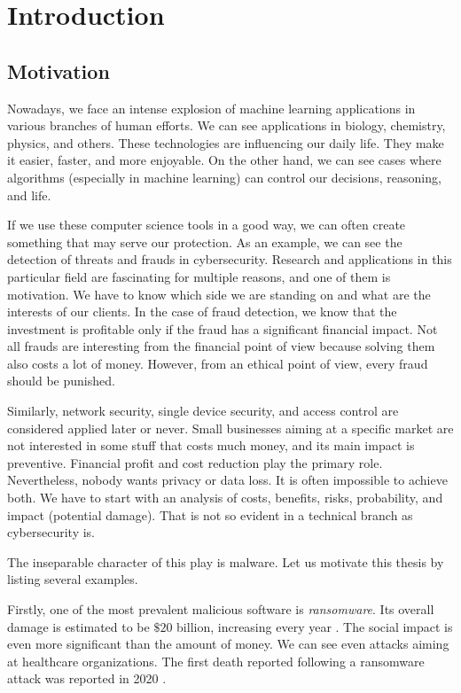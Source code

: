 \chapter{Introduction} \label{chap:intro}
\section*{Motivation}
Nowadays, we face an intense explosion of machine learning applications in various branches of human efforts. We can see applications in biology, chemistry, physics, and others. These technologies are influencing our daily life. They make it easier, faster, and more enjoyable. On the other hand, we can see cases where algorithms (especially in machine learning) can control our decisions, reasoning, and life.

If we use these computer science tools in a good way, we can often create something that may serve our protection. As an example, we can see the detection of threats and frauds in cybersecurity. Research and applications in this particular field are fascinating for multiple reasons, and one of them is motivation. We have to know which side we are standing on and what are the interests of our clients.  In the case of fraud detection, we know that the investment is profitable only if the fraud has a significant financial impact. Not all frauds are interesting from the financial point of view because solving them also costs a lot of money. However, from an ethical point of view, every fraud should be punished. 

Similarly, network security, single device security, and access control are considered applied later or never. Small businesses aiming at a specific market are not interested in some stuff that costs much money, and its main impact is preventive. Financial profit and cost reduction play the primary role. Nevertheless, nobody wants privacy or data loss. It is often impossible to achieve both. We have to start with an analysis of costs, benefits, risks, probability, and impact (potential damage). That is not so evident in a technical branch as cybersecurity is.

The inseparable character of this play is malware. Let us motivate this thesis by listing several examples.

Firstly, one of the most prevalent malicious software is \emph{ransomware}. Its overall damage is estimated to be $\$20$ billion, increasing every year \cite{purplesec2021}. The social impact is even more significant than the amount of money. We can see even attacks aiming at healthcare organizations. The first death reported following a ransomware attack was reported in 2020 \cite{Cimpanu2020}.

